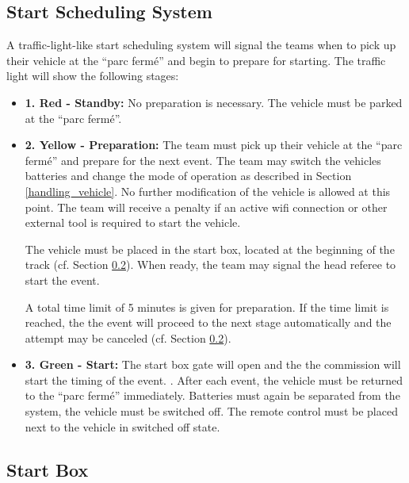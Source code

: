 \subsection{Start Scheduling System}
\label{start_scheduling}

A traffic-light-like start scheduling system will signal the teams when to pick
up their vehicle at the “parc fermé” and begin to prepare for starting. The
traffic light will show the following stages:

\begin{itemize}
	\item \textbf{1. Red - Standby:} \newline
	      No preparation is necessary. The vehicle must be parked at the “parc fermé”.

	\item \textbf{2. Yellow - Preparation:} \newline
	      The team must pick up their vehicle at the “parc fermé” and prepare for the next event. The team may switch the vehicles batteries and change the mode of operation as described in Section \ref{handling_vehicle}. No further modification of the vehicle is allowed at this point.
	      The team will receive a penalty if an active wifi connection or other external tool is required to start the vehicle.

	      The vehicle must be placed in the start box, located at the beginning of the
	      track (cf. Section \ref{start_box}). When ready, the team may signal the head
	      referee to start the event.

	      A total time limit of 5 minutes is given for preparation. If the time limit is
	      reached, the the event will proceed to the next stage automatically and the
	      attempt may be canceled (cf. Section \ref{start_box}).

	\item \textbf{3. Green - Start:} \newline
	      The start box gate will open and the the commission will start the timing of the event.
	      . After each event, the vehicle must be returned to the “parc fermé” immediately. Batteries must again be separated from the system, the vehicle must be switched off. The remote control must be placed next to the vehicle in switched off state.
\end{itemize}

\subsection{Start Box}
\label{start_box}

